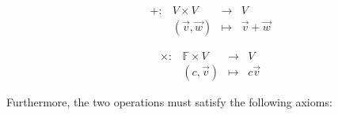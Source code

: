 \documentclass[11pt,fleqn]{book} %
\begin{document}
\begin{minipage}[t]{0.45\linewidth}
    $$\begin{matrix} &+: &V\times V  &\to &V \\& &(\overrightarrow{v},\overrightarrow{w}) &\mapsto &\overrightarrow{v}+\overrightarrow{w} \end{matrix}$$
\end{minipage}
\begin{minipage}[t]{0.45\linewidth}
    $$\begin{matrix} &\times: &\mathbb{F}\times V  &\to &V \\& &(c,\overrightarrow{v}) &\mapsto &c\overrightarrow{v} \end{matrix}$$
\end{minipage}

Furthermore, the two operations must satisfy the following axioms:
\end{document}
